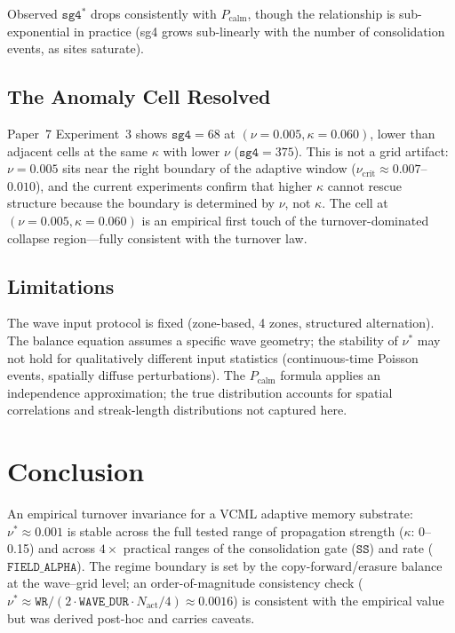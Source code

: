 \documentclass[11pt]{article}
\theoremstyle{remark}
\begin{document}
Observed $\mathtt{sg4}^*$ drops consistently with $P_{\text{calm}}$, though
the relationship is sub-exponential in practice (sg4 grows sub-linearly with
the number of consolidation events, as sites saturate).

\subsection{The Anomaly Cell Resolved}

Paper~7 Experiment~3 shows $\mathtt{sg4} = 68$ at $(\nu = 0.005, \kappa = 0.060)$,
lower than adjacent cells at the same $\kappa$ with lower $\nu$ ($\mathtt{sg4} = 375$).
This is not a grid artifact: $\nu = 0.005$ sits near the right boundary of the
adaptive window ($\nu_{\text{crit}} \approx 0.007$--$0.010$), and the current
experiments confirm that higher $\kappa$ cannot rescue structure because the
boundary is determined by $\nu$, not $\kappa$. The cell at
$(\nu = 0.005, \kappa = 0.060)$ is an empirical first touch of the
turnover-dominated collapse region---fully consistent with the turnover law.

\subsection{Limitations}

The wave input protocol is fixed (zone-based, 4 zones, structured alternation).
The balance equation assumes a specific wave geometry; the stability of $\nu^*$
may not hold for qualitatively different input statistics (continuous-time Poisson
events, spatially diffuse perturbations). The $P_{\text{calm}}$ formula applies
an independence approximation; the true distribution accounts for spatial
correlations and streak-length distributions not captured here.

\section{Conclusion}

An empirical turnover invariance for a VCML adaptive memory substrate: $\nu^*
\approx 0.001$ is stable across the full tested range of propagation strength
($\kappa$: 0--0.15) and across $4\times$ practical ranges of the consolidation
gate ($\mathtt{SS}$) and rate ($\mathtt{FIELD\_ALPHA}$). The regime boundary is
set by the copy-forward/erasure balance at the wave--grid level; an
order-of-magnitude consistency check ($\nu^* \approx \mathtt{WR} / (2 \cdot
\mathtt{WAVE\_DUR} \cdot N_{\text{act}}/4) \approx 0.0016$) is consistent with
the empirical value but was derived post-hoc and carries caveats.
\end{document}
